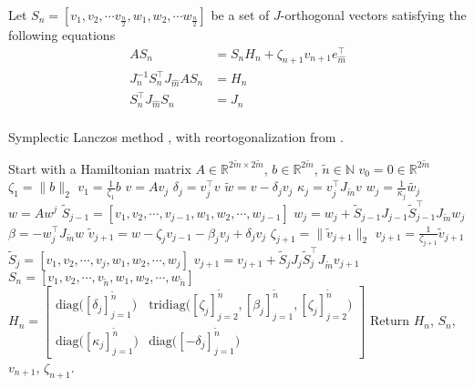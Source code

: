 Let $S_n = [v_1,v_2,\cdots v_{\frac{n}{2}},w_1,w_2,\cdots w_{\frac{n}{2}}]$ be a set of $J$-orthogonal vectors satisfying the following equations \cite{SLMprop}
\begin{equation}
\begin{aligned}
AS_n &= S_n H_n + \zeta_{n+1} v_{n+1} e_{\hat{m}}^\top\\
J_{n}^{-1} S_n^\top J_{\hat{m}} A S_n &= H_n \\
S_n^{\top} J_{\hat{m}} S_n &= J_{n}\\
\label{eqn:propS}
\end{aligned}
\end{equation}
\begin{algorithm} \caption{Symplectic Lanczos method \cite{SLM}, with reortogonalization from \cite{SLMO}. } \label{alg:symlanz}
\begin{algorithmic}
\STATE Start with a Hamiltonian matrix $A \in \mathbb{R}^{2\tilde{m} \times 2 \tilde{m}}$, $b \in \mathbb{R}^{2 \tilde{m}}$, $\tilde{n} \in \mathbb{N}$
\STATE $v_0= 0 \in \mathbb{R}^{2 \tilde{m}}$
\STATE $\zeta_1 = \| b\|_2$
\STATE $v_1= \frac{1}{\zeta_1}  b$
	\STATE $v = A v_j$
	\STATE $\delta_j =  v_j^\top v$
	\STATE $\tilde{w} = v-\delta_j v_j$
	\STATE $\kappa_j = v_j^\top J_{\tilde{m}} v $
	\STATE $w_j = \frac{1}{\kappa_j} \tilde{w_j}$
	\STATE $w = A w^j$
	\STATE $ \tilde{S}_{j-1} = [v_1,v_2,\cdots,v_{j-1},w_1,w_2,\cdots,w_{j-1}] $
	\STATE $ w_j = w_j + \tilde{S}_{j-1}J_{j-1} \tilde{S}_{j-1}^\top J_{\tilde{m}} w_j $
	\STATE $\beta = -w_j^\top J_{\tilde{m}} w$
	\STATE $\tilde{v}_{j+1} = w - \zeta_j v_{j-1} - \beta_j v_j + \delta_j v_j$
	\STATE $ \zeta_{j+1} = \|\tilde{v}_{j+1} \|_2 $
	\STATE $ v_{j+1} = \frac{1}{\zeta_{j+1}} \tilde{v}_{j+1} $
	\STATE $ \tilde{S}_j = [v_1,v_2,\cdots,v_{j},w_1,w_2,\cdots,w_{j}] $
	\STATE $ v_{j+1} = v_{j+1} + \tilde{S}_j J_j \tilde{S}_j^\top J_{\tilde{m}} v_{j+1} $
\ENDFOR
\STATE $S_n = [v_1,v_2,\cdots,v_{\tilde{n}},w_1,w_2,\cdots,w_{\tilde{n}}]$
\STATE $H_n = \begin{bmatrix}
\text{diag} \big( [\delta_j]^{\tilde{n}}_{j=1} \big) & \text{tridiag}\big( [\zeta_j]_{j=2}^{\tilde{n}},[\beta_j]_{j=1}^{\tilde{n}},[\zeta_j]_{j=2}^{\tilde{n}} \big) \\
\text{diag} \big( [\kappa_j]^{\tilde{n}}_{j=1} \big) & \text{diag} \big( [-\delta_j]^{\tilde{n}}_{j=1} \big)
\end{bmatrix} $
\STATE Return $H_n$, $S_n$, $v_{n+1}$, $\zeta_{n+1}$.
\end{algorithmic}
\end{algorithm}


